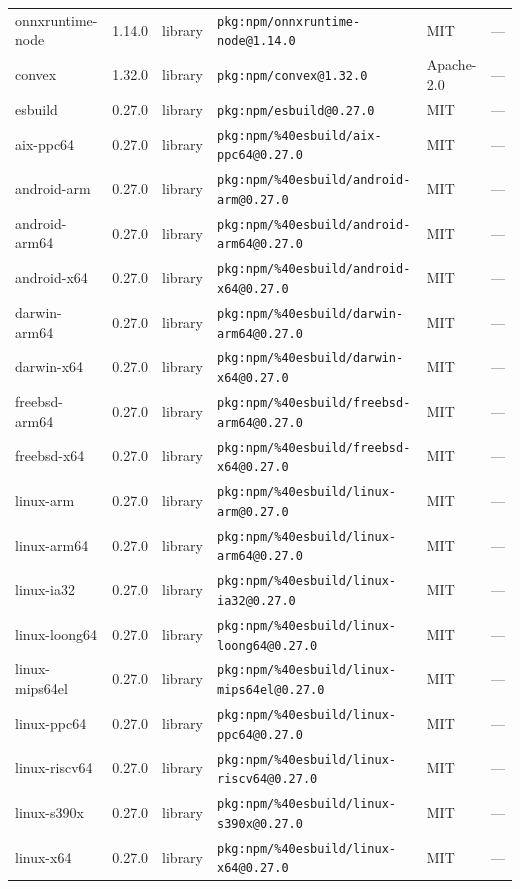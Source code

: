 \documentclass[11pt]{article}
\begin{document}
\begin{longtable}{|l|l|l|p{2.2cm}|l|p{4cm}|}
onnxruntime-node & 1.14.0 & library & \texttt{pkg:npm/onnxruntime-node@1.14.0} & MIT & — \\
convex & 1.32.0 & library & \texttt{pkg:npm/convex@1.32.0} & Apache-2.0 & — \\
esbuild & 0.27.0 & library & \texttt{pkg:npm/esbuild@0.27.0} & MIT & — \\
aix-ppc64 & 0.27.0 & library & \texttt{pkg:npm/\%40esbuild/aix-ppc64@0.27.0} & MIT & — \\
android-arm & 0.27.0 & library & \texttt{pkg:npm/\%40esbuild/android-arm@0.27.0} & MIT & — \\
android-arm64 & 0.27.0 & library & \texttt{pkg:npm/\%40esbuild/android-arm64@0.27.0} & MIT & — \\
android-x64 & 0.27.0 & library & \texttt{pkg:npm/\%40esbuild/android-x64@0.27.0} & MIT & — \\
darwin-arm64 & 0.27.0 & library & \texttt{pkg:npm/\%40esbuild/darwin-arm64@0.27.0} & MIT & — \\
darwin-x64 & 0.27.0 & library & \texttt{pkg:npm/\%40esbuild/darwin-x64@0.27.0} & MIT & — \\
freebsd-arm64 & 0.27.0 & library & \texttt{pkg:npm/\%40esbuild/freebsd-arm64@0.27.0} & MIT & — \\
freebsd-x64 & 0.27.0 & library & \texttt{pkg:npm/\%40esbuild/freebsd-x64@0.27.0} & MIT & — \\
linux-arm & 0.27.0 & library & \texttt{pkg:npm/\%40esbuild/linux-arm@0.27.0} & MIT & — \\
linux-arm64 & 0.27.0 & library & \texttt{pkg:npm/\%40esbuild/linux-arm64@0.27.0} & MIT & — \\
linux-ia32 & 0.27.0 & library & \texttt{pkg:npm/\%40esbuild/linux-ia32@0.27.0} & MIT & — \\
linux-loong64 & 0.27.0 & library & \texttt{pkg:npm/\%40esbuild/linux-loong64@0.27.0} & MIT & — \\
linux-mips64el & 0.27.0 & library & \texttt{pkg:npm/\%40esbuild/linux-mips64el@0.27.0} & MIT & — \\
linux-ppc64 & 0.27.0 & library & \texttt{pkg:npm/\%40esbuild/linux-ppc64@0.27.0} & MIT & — \\
linux-riscv64 & 0.27.0 & library & \texttt{pkg:npm/\%40esbuild/linux-riscv64@0.27.0} & MIT & — \\
linux-s390x & 0.27.0 & library & \texttt{pkg:npm/\%40esbuild/linux-s390x@0.27.0} & MIT & — \\
linux-x64 & 0.27.0 & library & \texttt{pkg:npm/\%40esbuild/linux-x64@0.27.0} & MIT & — \\

\end{longtable}
\end{document}
